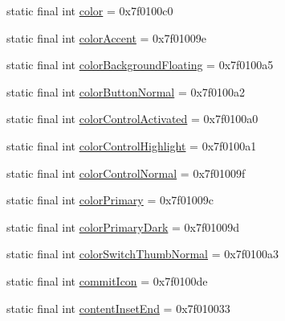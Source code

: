\begin{CompactItemize}
\item 
static final int \hyperlink{classandroid_1_1support_1_1graphics_1_1drawable_1_1animated_1_1_r_1_1attr_196d4959f3e72768259ef2a42e6b164e}{color} = 0x7f0100c0
\item 
static final int \hyperlink{classandroid_1_1support_1_1graphics_1_1drawable_1_1animated_1_1_r_1_1attr_a2c5ce33421939aefce4d10816b43204}{colorAccent} = 0x7f01009e
\item 
static final int \hyperlink{classandroid_1_1support_1_1graphics_1_1drawable_1_1animated_1_1_r_1_1attr_1a7a780b1a00914e33a729f0c0647fc9}{colorBackgroundFloating} = 0x7f0100a5
\item 
static final int \hyperlink{classandroid_1_1support_1_1graphics_1_1drawable_1_1animated_1_1_r_1_1attr_e4c5f9516b3f1c663f183705d9eed6b2}{colorButtonNormal} = 0x7f0100a2
\item 
static final int \hyperlink{classandroid_1_1support_1_1graphics_1_1drawable_1_1animated_1_1_r_1_1attr_1a38759503c34f55e40d9d5b334af231}{colorControlActivated} = 0x7f0100a0
\item 
static final int \hyperlink{classandroid_1_1support_1_1graphics_1_1drawable_1_1animated_1_1_r_1_1attr_a7654b7657e3f021a4a39d181ebd28e2}{colorControlHighlight} = 0x7f0100a1
\item 
static final int \hyperlink{classandroid_1_1support_1_1graphics_1_1drawable_1_1animated_1_1_r_1_1attr_af02e72ccd1066ca4962bf5f3a2cd3d2}{colorControlNormal} = 0x7f01009f
\item 
static final int \hyperlink{classandroid_1_1support_1_1graphics_1_1drawable_1_1animated_1_1_r_1_1attr_99c2da94cc305518de10c2953b974877}{colorPrimary} = 0x7f01009c
\item 
static final int \hyperlink{classandroid_1_1support_1_1graphics_1_1drawable_1_1animated_1_1_r_1_1attr_047432d94a72e1f7f4d6b0d8cd627e8b}{colorPrimaryDark} = 0x7f01009d
\item 
static final int \hyperlink{classandroid_1_1support_1_1graphics_1_1drawable_1_1animated_1_1_r_1_1attr_aa3c70b2ea37c0ce9be27034ae3f3112}{colorSwitchThumbNormal} = 0x7f0100a3
\item 
static final int \hyperlink{classandroid_1_1support_1_1graphics_1_1drawable_1_1animated_1_1_r_1_1attr_82f6482bbcd862ee920b14dd6d9f2a30}{commitIcon} = 0x7f0100de
\item 
static final int \hyperlink{classandroid_1_1support_1_1graphics_1_1drawable_1_1animated_1_1_r_1_1attr_54c6d621d7b930d8483ad8d99cd6cd36}{contentInsetEnd} = 0x7f010033
\item 

\end{CompactItemize}
